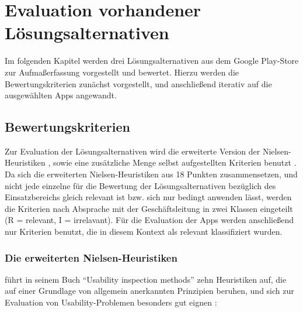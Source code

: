\chapter{Evaluation vorhandener Lösungsalternativen}
Im folgenden Kapitel werden drei Lösungsalternativen aus dem Google Play-Store zur Aufmaßerfassung vorgestellt und bewertet. Hierzu werden die Bewertungskriterien zunächst vorgestellt, und anschließend iterativ auf die ausgewählten Apps angewandt.

\section{Bewertungskriterien}
Zur Evaluation der Lösungsalternativen wird die erweiterte Version der Nielsen-Heuristiken \citep{Nielsen94}, sowie eine zusätzliche Menge selbst aufgestellten Kriterien benutzt .
Da sich die erweiterten Nielsen-Heuristiken aus 18 Punkten zusammensetzen, und nicht jede einzelne für die Bewertung der Lösungsalternativen bezüglich des Einsatzbereichs gleich relevant ist bzw. sich nur bedingt anwenden lässt, werden die Kriterien nach Absprache mit der Geschäftsleitung in zwei Klassen eingeteilt (R = relevant, I = irrelavant).
Für die Evaluation der Apps werden anschließend nur Kriterien benutzt, die in diesem Kontext als relevant klassifiziert wurden.

\subsection{Die erweiterten Nielsen-Heuristiken}\label{subsec:nielsen}
\citeauthor{Nielsen94} führt in seinem Buch ``Usability inspection methods'' zehn Heuristiken auf, die auf einer Grundlage von allgemein anerkannten Prinzipien beruhen, und sich zur Evaluation von Usability-Problemen besonders gut eignen \citep[Seiten 25--62]{Nielsen94}: 

\begin{enumerate}
\end{enumerate} 

